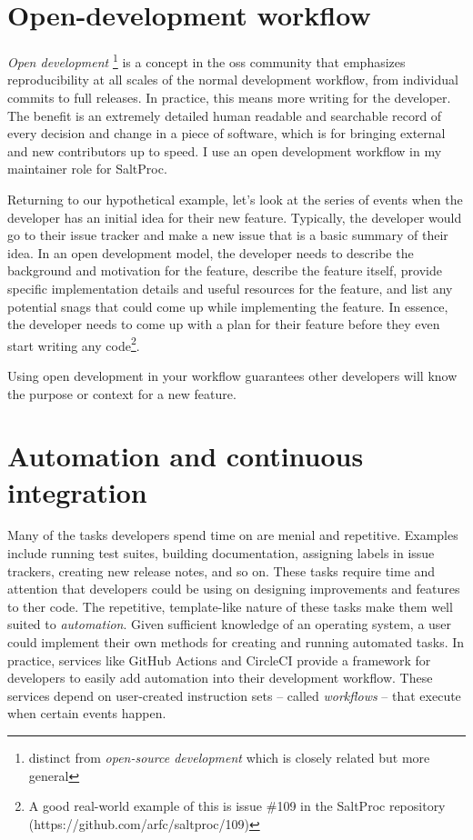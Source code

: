 \documentclass{anstrans}
\begin{document}
\section{Open-development workflow}

    {\it Open development} \footnote{distinct from {\it open-source development} which is closely related but more general}  is a concept in the \Gls{oss} community that emphasizes reproducibility at all scales of the normal development workflow, from individual commits to full releases. In practice, this means more writing for the developer. The benefit is an extremely detailed human readable and searchable record of every decision and change in a piece of software, which is for bringing external and new contributors up to speed. I use an open development workflow in my maintainer role for SaltProc.
    
    Returning to our hypothetical example, let's look at the series of events when the developer has an initial idea for their new feature. Typically, the developer would go to their issue tracker and make a new issue that is a basic summary of their idea. In an open development model, the developer needs to describe the background and motivation for the feature, describe the feature itself, provide specific implementation details and useful resources for the feature, and list any potential snags that could come up while implementing the feature. In essence, the developer needs to come up with a plan for their feature before they even start writing any code\footnote{A good real-world example of this is issue \#109 in the SaltProc repository (https://github.com/arfc/saltproc/109)}.
    
    Using open development in your workflow guarantees other developers will know the purpose or context for a new feature.
    
\section{Automation and continuous integration}
    Many of the tasks developers spend time on are menial and repetitive. Examples include running test suites, building documentation, assigning labels in issue trackers, creating new release notes, and so on. These tasks require time and attention that developers could be using on designing improvements and features to ther code. The repetitive, template-like nature of these tasks make them well suited to {\it automation}. Given sufficient knowledge of an operating system, a user could implement their own methods for creating and running automated tasks. In practice, services like GitHub Actions and CircleCI provide a framework for developers to easily add automation into their development workflow. These services depend on user-created instruction sets -- called {\it workflows} -- that execute when certain events happen.
\end{document}
